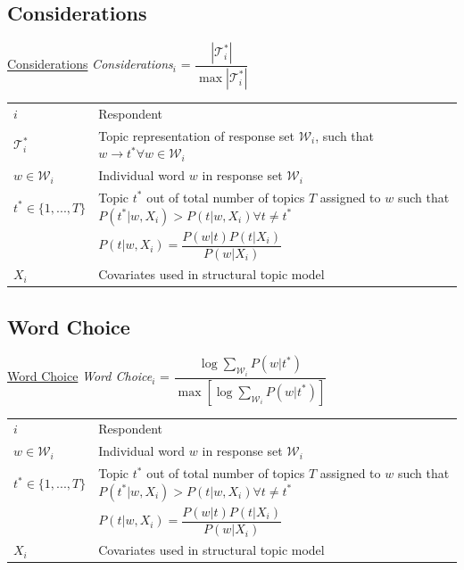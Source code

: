 \subsection{Considerations}
\begin{frame}{\hyperlink{components}{Considerations}}\label{elaboration}\centering
\emph{Considerations}$_i$ = $\dfrac{|\mathcal{T}^*_i|}{\max|\mathcal{T}^*_i|}$
\vspace{1em}\\
\begin{tabular}{lp{8.5cm}}
\toprule
$i$ & Respondent \\
$\mathcal{T}^*_i $ & Topic representation of response set $\mathcal{W}_i$, such that $w\rightarrow t^*\forall w \in \mathcal{W}_i$ \\
$w \in \mathcal{W}_i$ & Individual word $w$ in response set $\mathcal{W}_i$\\

$t^* \in \{1,...,T\} $ & Topic $t^*$ out of total number of topics $T$ assigned to $w$ such that $P(t^*|w,X_i) > P(t|w,X_i) \forall t\neq t^*$\\
& $P(t|w,X_i)=\dfrac{P(w|t)P(t|X_i)}{P(w|X_i)}$ \\
$X_i$ & Covariates used in structural topic model
\end{tabular}
\end{frame}

\subsection{Word Choice}
\begin{frame}{\hyperlink{components}{Word Choice}}\label{eloquence}\centering
\emph{Word Choice$_i$} = $\dfrac{\log\sum_{\mathcal{W}_i} P(w|t^*)}{\max\left[\log\sum_{\mathcal{W}_i} P(w|t^*)\right]}$
\vspace{1em}\\
\begin{tabular}{lp{8.5cm}}
\toprule
$i$ & Respondent \\
$w \in \mathcal{W}_i$ & Individual word $w$ in response set $\mathcal{W}_i$\\
$t^* \in \{1,...,T\} $ & Topic $t^*$ out of total number of topics $T$ assigned to $w$ such that $P(t^*|w,X_i) > P(t|w,X_i) \forall t\neq t^*$\\
& $P(t|w,X_i)=\dfrac{P(w|t)P(t|X_i)}{P(w|X_i)}$ \\
$X_i$ & Covariates used in structural topic model
\end{tabular}
\end{frame}



